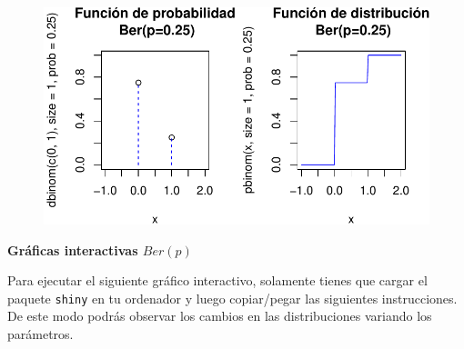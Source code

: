 \documentclass[
  letterpaper,
  DIV=11,
  numbers=noendperiod]{scrreprt}
\begin{document}
\begin{figure}

{\centering \includegraphics{3_files/figure-pdf/unnamed-chunk-3-1.pdf}

}

\end{figure}

\textbf{Gráficas interactivas \(Ber(p)\)}

Para ejecutar el siguiente gráfico interactivo, solamente tienes que
cargar el paquete \texttt{shiny} en tu ordenador y luego copiar/pegar
las siguientes instrucciones. De este modo podrás observar los cambios
en las distribuciones variando los parámetros.
\end{document}
